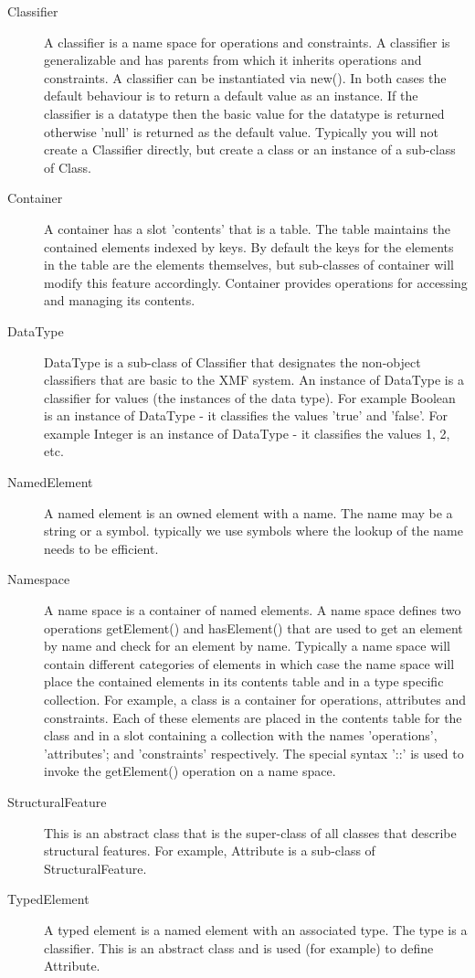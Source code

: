 \begin{description}
\item [Classifier] A classifier is a name space for operations and
constraints. A classifier is generalizable and has parents from
which it inherits operations and constraints. A classifier can be
instantiated via new(). In both cases the default behaviour is to
return a default value as an instance. If the classifier is a
datatype then the basic value for the datatype is returned
otherwise 'null' is returned as the default value. Typically you
will not create a Classifier directly, but create a class or an
instance of a sub-class of Class. \item [Container] A container
has a slot 'contents' that is a table. The table maintains the
contained elements indexed by keys. By default the keys for the
elements in the table are the elements themselves, but sub-classes
of container will modify this feature accordingly. Container
provides operations for accessing and managing its contents. \item
[DataType] DataType is a sub-class of Classifier that designates
the non-object classifiers that are basic to the XMF system. An
instance of DataType is a classifier for values (the instances of
the data type). For example Boolean is an instance of DataType -
it classifies the values 'true' and 'false'. For example Integer
is an instance of DataType - it classifies the values 1, 2, etc.
\item [NamedElement] A named element is an owned element with a
name. The name may be a string or a symbol. typically we use
symbols where the lookup of the name needs to be efficient. \item
[Namespace] A name space is a container of named elements. A name
space defines two operations getElement() and hasElement() that
are used to get an element by name and check for an element by
name. Typically a name space will contain different categories of
elements in which case the name space will place the contained
elements in its contents table and in a type specific collection.
For example, a class is a container for operations, attributes and
constraints. Each of these elements are placed in the contents
table for the class and in a slot containing a collection with the
names 'operations', 'attributes'; and 'constraints' respectively.
The special syntax '::' is used to invoke the getElement()
operation on a name space. \item [StructuralFeature] This is an
abstract class that is the super-class of all classes that
describe structural features. For example, Attribute is a
sub-class of StructuralFeature. \item [TypedElement] A typed
element is a named element with an associated type. The type is a
classifier. This is an abstract class and is used (for example) to
define Attribute.

\end{description}

